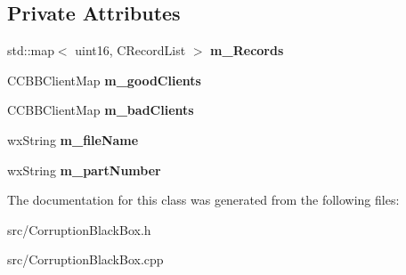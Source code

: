 \subsection*{Private Attributes}
\begin{DoxyCompactItemize}
\item 
std::map$<$ uint16, CRecordList $>$ {\bfseries m\_\-Records}\label{classCCorruptionBlackBox_ab7fb03b0ed148c1b6580e3c191baaf12}

\item 
CCBBClientMap {\bfseries m\_\-goodClients}\label{classCCorruptionBlackBox_ab02e29150f12eaabb58b5773c41345bb}

\item 
CCBBClientMap {\bfseries m\_\-badClients}\label{classCCorruptionBlackBox_a7a967b6e669cf681627e6aba690e7de7}

\item 
wxString {\bfseries m\_\-fileName}\label{classCCorruptionBlackBox_aa186f9a665e36350cf93124647134e34}

\item 
wxString {\bfseries m\_\-partNumber}\label{classCCorruptionBlackBox_a4c8448fad2ae0f0a5dc7e8470e954fd1}

\end{DoxyCompactItemize}


The documentation for this class was generated from the following files:\begin{DoxyCompactItemize}
\item 
src/CorruptionBlackBox.h\item 
src/CorruptionBlackBox.cpp\end{DoxyCompactItemize}
